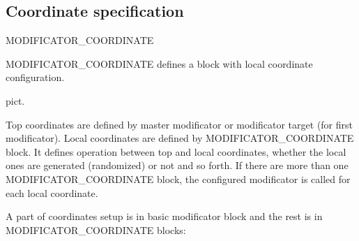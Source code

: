 \documentclass[11pt]{article}
\begin{document}
\subsection{Coordinate specification}
MODIFICATOR\_COORDINATE

MODIFICATOR\_COORDINATE defines a block with local coordinate configuration.

pict.

Top coordinates are defined by master modificator or modificator target
(for first modificator). Local coordinates are defined by MODIFICATOR\_COORDINATE
block. It defines operation between top and local coordinates, whether the local
ones are generated (randomized) or not and so forth. If there are more than one
MODIFICATOR\_COORDINATE block, the configured modificator is called for each local
coordinate.

A part of coordinates setup is in basic modificator block and the rest 
is in MODIFICATOR\_COORDINATE blocks:
\end{document}
